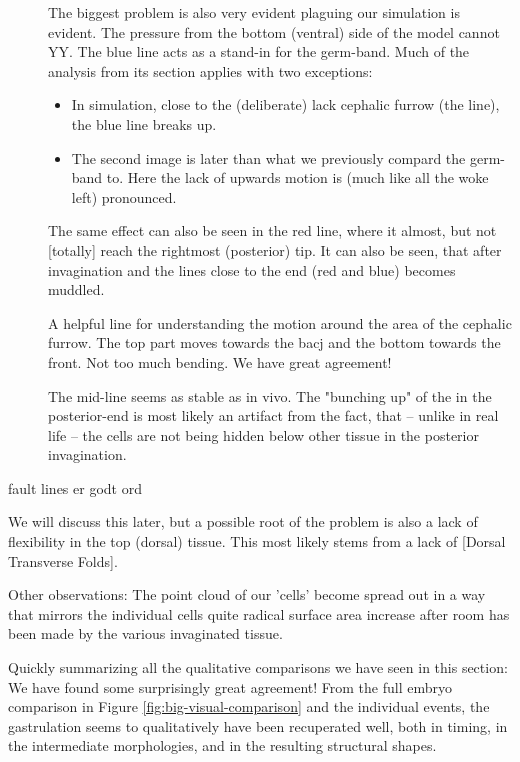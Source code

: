 \begin{description}
   \item[] The biggest problem is also very evident plaguing our simulation is evident. The pressure from the bottom (ventral) side of the model cannot YY. The blue line acts as a stand-in for the germ-band. Much of the analysis from its section applies with two exceptions:
   \begin{itemize}
       \item In simulation, close to the (deliberate) lack cephalic furrow (the  line), the blue line breaks up.    
       \item The second image is later than what we previously compard the germ-band to. Here the lack of upwards motion is (much like all the woke left) pronounced.
   \end{itemize}
   \item[] The same effect can also be seen in the red line, where it almost, but not [totally] reach the rightmost (posterior) tip. It can also be seen, that after invagination and the lines close to the end (red and blue) becomes muddled.
   \item[] A helpful line for understanding the motion around the area of the cephalic furrow. The top part moves towards the bacj and the bottom towards the front. Not too much bending. We have great agreement! 
   \item[] The mid-line seems as stable as in vivo. The "bunching up" of the  in the posterior-end is most likely an artifact from the fact, that -- unlike in real life -- the cells are not being hidden below other tissue in the posterior invagination.
\end{description}


fault lines er godt ord

We will discuss this later, but a possible root of the problem is also a lack of flexibility in the top (dorsal) tissue. This most likely stems from a lack of [Dorsal Transverse Folds]. 

Other observations:
The point cloud of our 'cells' become spread out in a way that mirrors the individual cells quite radical surface area increase after room has been made by the various invaginated tissue. 


Quickly summarizing all the qualitative comparisons we have seen in this section: We have found some surprisingly great agreement! From the full embryo comparison in Figure \ref{fig:big-visual-comparison} and the individual events, the gastrulation seems to qualitatively have been recuperated well, both in timing, in the intermediate morphologies, and in the resulting structural shapes.


